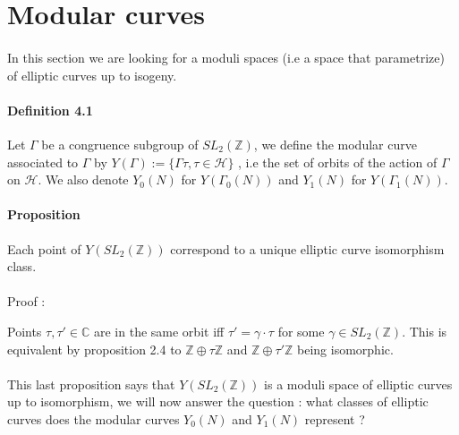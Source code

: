 \documentclass[letterpaper,10pt]{article}
\begin{document}
\section{Modular curves}%

{\itshape \paragraph{} In this section we are looking for a moduli spaces (i.e a space that parametrize) of elliptic curves up to isogeny. 
}



\paragraph{Definition 4.1} Let $\Gamma$ be a congruence subgroup of $SL_2(\mathbb{Z})$, we define the modular curve associated to $\Gamma$ by
 $Y(\Gamma) := \{ \Gamma\tau , \tau \in \mathcal{H} \}$ , i.e the set of orbits of the action of $\Gamma$ on $\mathcal{H}$. We also denote $Y_0(N)$ for $Y(\Gamma_0(N))$
 and $Y_1(N)$ for $Y(\Gamma_1(N))$.


\paragraph{Proposition } Each point of $Y(SL_2(\mathbb{Z}))$ correspond to a unique elliptic curve isomorphism class.

{\itshape \paragraph{}Proof : } Points $\tau, \tau' \in \mathbb{C}$ are in the same orbit iff $\tau' = \gamma \cdot \tau$ for some $\gamma \in SL_2(\mathbb{Z})$.
This is equivalent by proposition  2.4 to $\mathbb{Z} \oplus \tau\mathbb{Z}$ and $\mathbb{Z} \oplus \tau'\mathbb{Z}$ being isomorphic.



{\itshape \paragraph{} This last proposition says that $Y(SL_2(\mathbb{Z}))$ is a moduli space of elliptic curves up to isomorphism, we will now answer the question :
what classes of elliptic curves does the modular curves $Y_0(N)$ and $Y_1(N)$ represent ?  } 
\end{document}
